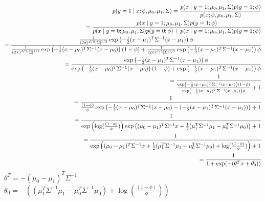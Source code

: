 \begin{answer}
\begin{eqnarray*}
p(y = 1\mid x; \phi, \mu_0, \mu_1, \Sigma)
=\frac{p(x \mid y = 1;\mu_0, \mu_1, \Sigma)p(y=1;\phi)}{p(x;\phi, \mu_0, \mu_1, \Sigma)}\\
=\frac{p(x \mid y = 1;\mu_0, \mu_1, \Sigma)p(y=1;\phi)}{p(x \mid y = 0;\mu_0, \mu_1, \Sigma)p(y=0;\phi)+p(x \mid y = 1;\mu_0, \mu_1, \Sigma)p(y=1;\phi)}\\
=\frac{\frac{1}{(2\pi)^{{d}/2} |\Sigma|^{1/2}}\exp\left(-\frac{1}{2}(x-\mu_1)^T \Sigma^{-1} (x-\mu_1) \right)\phi}{\frac{1}{(2\pi)^{{d}/2} |\Sigma|^{1/2}}\exp\left(-\frac{1}{2}(x-\mu_{0})^T \Sigma^{-1} (x-\mu_{0})\right)(1-\phi)+\frac{1}{(2\pi)^{{d}/2} |\Sigma|^{1/2}}\exp\left(-\frac{1}{2}(x-\mu_1)^T \Sigma^{-1} (x-\mu_1) \right)\phi}\\
=\frac{\exp\left(-\frac{1}{2}(x-\mu_1)^T \Sigma^{-1} (x-\mu_1) \right)\phi}{\exp\left(-\frac{1}{2}(x-\mu_{0})^T \Sigma^{-1} (x-\mu_{0})\right)(1-\phi)+\exp\left(-\frac{1}{2}(x-\mu_1)^T \Sigma^{-1} (x-\mu_1) \right)\phi}\\
=\frac{1}{\frac{\exp\left(-\frac{1}{2}(x-\mu_{0})^T \Sigma^{-1} (x-\mu_{0})\right)(1-\phi)}{\exp\left(-\frac{1}{2}(x-\mu_1)^T \Sigma^{-1} (x-\mu_1) \right)\phi}+1}\\
=\frac{1}{\frac{(1-\phi)}{\phi}\exp\left(-\frac{1}{2}(x-\mu_{0})^T \Sigma^{-1} (x-\mu_{0})-(-\frac{1}{2}(x-\mu_1)^T \Sigma^{-1} (x-\mu_1))\right)+1}\\
=\frac{1}{\exp\left(\log(\frac{(1-\phi)}{\phi})\right)\exp\left((\mu_0-\mu_1)^T\Sigma^{-1}x+\frac{1}{2}(\mu_1^T\Sigma^{-1}\mu_1-\mu_0^T\Sigma^{-1}\mu_0)\right)+1}\\
=\frac{1}{\exp\left((\mu_0-\mu_1)^T\Sigma^{-1}x+\frac{1}{2}(\mu_1^T\Sigma^{-1}\mu_1-\mu_0^T\Sigma^{-1}\mu_0)+\log(\frac{(1-\phi)}{\phi})\right)+1}\\
= \frac{1}{1 + \exp(-(\theta^T x + \theta_0))}
\end{eqnarray*}
${\theta^T=-(\mu_0-\mu_1)^T\Sigma^{-1}}$\\
${\theta_0=-((\mu_1^T\Sigma^{-1}\mu_1-\mu_0^T\Sigma^{-1}\mu_0)+\log(\frac{(1-\phi)}{\phi}))}$
\end{answer}
